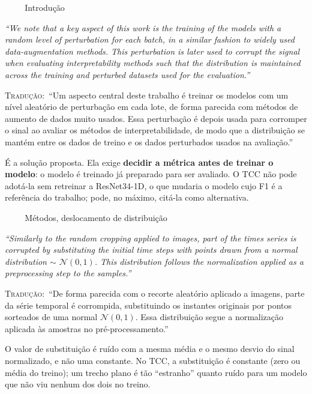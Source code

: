 \documentclass[11pt,a4paper]{article}
\newcommand{\pagechip}[1]{{\setlength{\fboxsep}{1.5pt}\colorbox{cAcc}{\textcolor{white}{\scriptsize\texttt{#1}}}}}
\newenvironment{origquote}{\par\itshape\small}{\par}
\newenvironment{tradquote}{\par\small\textsc{Tradução:}\ }{\par}
\newcommand{\explab}[1]{\par\smallskip{\small\color{cAcc}\textbf{\MakeUppercase{#1}}}\par}
\begin{document}
\begin{citacard}{\pagechip{p. 2} Introdução}
\begin{origquote}“We note that a key aspect of this work is the training of the models with a random level of perturbation for each batch, in a similar fashion to widely used data-augmentation methods. This perturbation is later used to corrupt the signal when evaluating interpretability methods such that the distribution is maintained across the training and perturbed datasets used for the evaluation.”\end{origquote}
\begin{tradquote}“Um aspecto central deste trabalho é treinar os modelos com um nível aleatório de perturbação em cada lote, de forma parecida com métodos de aumento de dados muito usados. Essa perturbação é depois usada para corromper o sinal ao avaliar os métodos de interpretabilidade, de modo que a distribuição se mantém entre os dados de treino e os dados perturbados usados na avaliação.”\end{tradquote}
\explab{Explicação}
É a solução proposta. Ela exige \textbf{decidir a métrica antes de treinar o modelo}: o modelo é treinado já preparado para ser avaliado. O TCC não pode adotá-la sem retreinar a ResNet34-1D, o que mudaria o modelo cujo F1 é a referência do trabalho; pode, no máximo, citá-la como alternativa.
\end{citacard}

\begin{citacard}{\pagechip{p. 7} Métodos, deslocamento de distribuição}
\begin{origquote}“Similarly to the random cropping applied to images, part of the times series is corrupted by substituting the initial time steps with points drawn from a normal distribution $\sim$ $\mathcal{N}(0, 1)$. This distribution follows the normalization applied as a preprocessing step to the samples.”\end{origquote}
\begin{tradquote}“De forma parecida com o recorte aleatório aplicado a imagens, parte da série temporal é corrompida, substituindo os instantes originais por pontos sorteados de uma normal $\mathcal{N}(0, 1)$. Essa distribuição segue a normalização aplicada às amostras no pré-processamento.”\end{tradquote}
\explab{Explicação}
O valor de substituição é ruído com a mesma média e o mesmo desvio do sinal normalizado, e não uma constante. No TCC, a substituição é constante (zero ou média do treino); um trecho plano é tão “estranho” quanto ruído para um modelo que não viu nenhum dos dois no treino.
\end{citacard}
\end{document}
